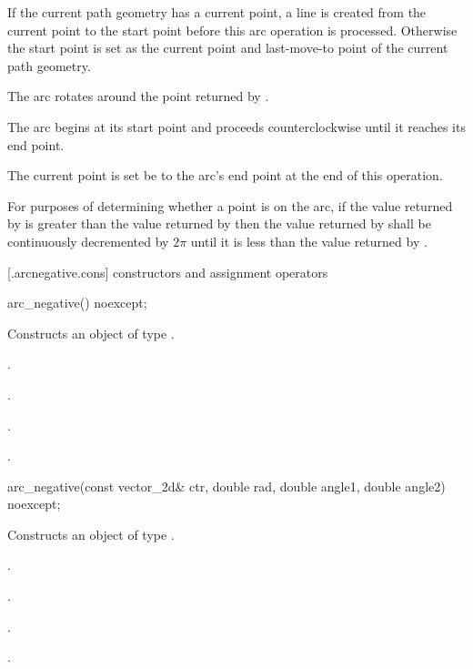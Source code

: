 \pnum
If the current path geometry has a current point, a line is created from the current point to the start point before this arc operation is processed. Otherwise the start point is set as the current point and last-move-to point of the current path geometry.

\pnum
The arc rotates around the point returned by .

\pnum
The arc begins at its start point and proceeds counterclockwise until it reaches its end point.

\pnum
The current point is set be to the arc's end point at the end of this operation.

\pnum
For purposes of determining whether a point is on the arc, if the value returned by  is greater than the value returned by  then the value returned by  shall be continuously decremented by $2\pi$ until it is less than the value returned by .

 [\iotwod.arcnegative.cons] { constructors and assignment operators}

\begin{itemdecl}
    arc_negative() noexcept;
\end{itemdecl}
\begin{itemdescr}
	\pnum
	\effects
	Constructs an object of type .
	
	\pnum
	\postconditions
	.

	.

	.

	.

\end{itemdescr}

\begin{itemdecl}
    arc_negative(const vector_2d& ctr, double rad, double angle1,
      double angle2) noexcept;
\end{itemdecl}
\begin{itemdescr}
	\pnum
	\effects
	Constructs an object of type .
	
	\pnum
	\postconditions
	.

	.

	.

	.

\end{itemdescr}

